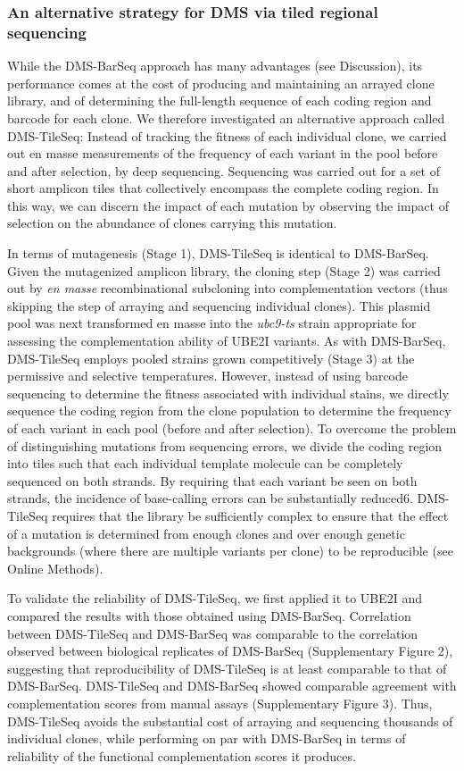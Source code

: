 \subsubsection{An alternative strategy for DMS via tiled regional sequencing}

While the DMS-BarSeq approach has many advantages (see Discussion), its performance comes at the cost of producing and maintaining an arrayed clone library, and of determining the full-length sequence of each coding region and barcode for each clone. We therefore investigated an alternative approach called DMS-TileSeq: Instead of tracking the fitness of each individual clone, we carried out en masse measurements of the frequency of each variant in the pool before and after selection, by deep sequencing.  Sequencing was carried out for a set of short amplicon tiles that collectively encompass the complete coding region.  In this way, we can discern the impact of each mutation by observing the impact of selection on the abundance of clones carrying this mutation.

In terms of mutagenesis (Stage 1), DMS-TileSeq is identical to DMS-BarSeq.  Given the mutagenized amplicon library, the cloning step (Stage 2) was carried out by \textit{en masse} recombinational subcloning into complementation vectors (thus skipping the step of arraying and sequencing individual clones).  This plasmid pool was next transformed en masse into the \textit{ubc9-ts} strain appropriate for assessing the complementation ability of UBE2I variants. As with DMS-BarSeq, DMS-TileSeq employs pooled strains grown competitively (Stage 3) at the permissive and selective temperatures. However, instead of using barcode sequencing to determine the fitness associated with individual stains, we directly sequence the coding region from the clone population to determine the frequency of each variant in each pool (before and after selection). To overcome the problem of distinguishing mutations from sequencing errors, we divide the coding region into tiles such that each individual template molecule can be completely sequenced on both strands.  By requiring that each variant be seen on both strands, the incidence of base-calling errors can be substantially reduced6.  DMS-TileSeq requires that the library be sufficiently complex to ensure that the effect of a mutation is determined from enough clones and over enough genetic backgrounds (where there are multiple variants per clone) to be reproducible (see Online Methods).

To validate the reliability of DMS-TileSeq, we first applied it to UBE2I and compared the results with those obtained using DMS-BarSeq. Correlation between DMS-TileSeq and DMS-BarSeq was comparable to the correlation observed between biological replicates of DMS-BarSeq (Supplementary Figure 2), suggesting that reproducibility of DMS-TileSeq is at least comparable to that of DMS-BarSeq. DMS-TileSeq and DMS-BarSeq showed comparable agreement with complementation scores from manual assays (Supplementary Figure 3).  Thus, DMS-TileSeq avoids the substantial cost of arraying and sequencing thousands of individual clones, while performing on par with DMS-BarSeq in terms of reliability of the functional complementation scores it produces.


